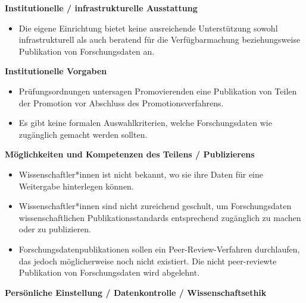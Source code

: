 \documentclass[a4paper,
fontsize=11pt,
oneside,
numbers=noperiodatend,
parskip=half-,
bibliography=totoc,
final
]{scrartcl}
\begin{document}
\textbf{Institutionelle / infrastrukturelle Ausstattung}

\begin{itemize}
\tightlist
\item
  Die eigene Einrichtung bietet keine ausreichende Unterstützung sowohl
  infrastrukturell als auch beratend für die Verfügbarmachung
  beziehungsweise Publikation von Forschungsdaten an.
\end{itemize}

\textbf{Institutionelle Vorgaben}

\begin{itemize}
\item
  Prüfungsordnungen untersagen Promovierenden eine Publikation von
  Teilen der Promotion vor Abschluss des Promotionsverfahrens.
\item
  Es gibt keine formalen Auswahlkriterien, welche Forschungsdaten wie
  zugänglich gemacht werden sollten.
\end{itemize}

\newpage 

\textbf{Möglichkeiten und Kompetenzen des Teilens / Publizierens}

\begin{itemize}
\item
  Wissenschaftler*innen ist nicht bekannt, wo sie ihre Daten für eine
  Weitergabe hinterlegen können.
\item
  Wissenschaftler*innen sind nicht zureichend geschult, um
  Forschungsdaten wissenschaftlichen Publikationsstandards entsprechend
  zugänglich zu machen oder zu publizieren.
\item
  Forschungsdatenpublikationen sollen ein Peer-Review-Verfahren
  durchlaufen, das jedoch möglicherweise noch nicht existiert. Die nicht
  peer-reviewte Publikation von Forschungsdaten wird abgelehnt.
\end{itemize}

\textbf{Persönliche Einstellung / Datenkontrolle / Wissenschaftsethik}
\end{document}
